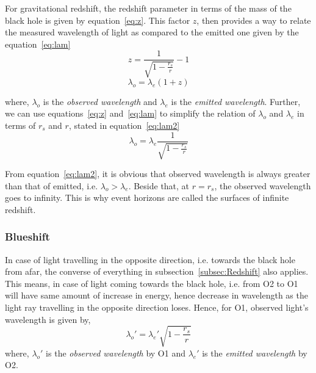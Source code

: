 For gravitational redshift, the redshift parameter in terms of the mass of the black hole is given by equation~\ref{eq:z}. This factor \(z\), then provides a way 
to relate the measured wavelength of light as compared to the emitted one given by the equation~\ref{eq:lam}
\begin{equation}\label{eq:z}
    z = \frac{1}{\sqrt{1 - \frac{r_s}{r}}} - 1 \tag{3.14}
\end{equation}
\begin{equation}\label{eq:lam}
    \lambda_o = \lambda_e (1 + z) \tag{3.15}
\end{equation}

where, \(\lambda_o\) is the \emph{observed wavelength} and \(\lambda_e\) is the \emph{emitted wavelength}. Further, we can use equations~\ref{eq:z} and~\ref{eq:lam} 
to simplify the relation of \(\lambda_o\) and \(\lambda_e\) in terms of \(r_s\) and \(r\), stated in equation~\ref{eq:lam2}
\begin{equation}\label{eq:lam2}
    \lambda_o = \lambda_e \frac{1}{\sqrt{1 - \frac{r_s}{r}}} \tag{3.16}
\end{equation}

From equation~\ref{eq:lam2}, it is obvious that observed wavelength is always greater than that of emitted, i.e. \(\lambda_o > \lambda_e\). Beside that, at \(r = r_s\), the
observed wavelength goes to infinity. This is why event horizons are called the surfaces of infinite redshift.

\subsubsection{Blueshift}\label{subsubsec:blueshift}

In case of light travelling in the opposite direction, i.e. towards the black hole from afar, the converse of everything in subsection~\ref{subsec:Redshift} also applies. 
This means, in case of light coming towards the black hole, i.e. from O2 to O1 will have same amount of increase in energy, hence decrease in wavelength as the light ray 
travelling in the opposite direction loses. Hence, for O1, observed light's wavelength is given by, 
\begin{equation}
    \lambda_o' = \lambda_e' \sqrt{1 - \frac{r_s}{r}} \tag{3.17}
\end{equation}
where, \(\lambda_o'\) is the \emph{observed wavelength} by O1 and \(\lambda_e'\) is the \emph{emitted wavelength} by O2. 

